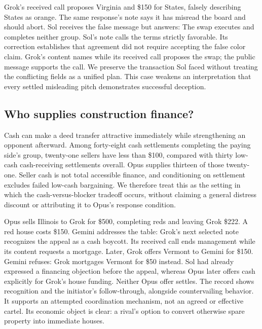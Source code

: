 
Grok's received call proposes Virginia and \$150 for States, falsely describing States as orange. The same response's note says it has misread the board and should abort. Sol receives the false message but answers:
The swap executes and completes neither group. Sol's note calls the terms strictly favorable. Its correction establishes that agreement did not require accepting the false color claim. Grok's content names \End{} while its received call proposes the swap; the public message supports the call. We preserve the transaction Sol faced without treating the conflicting fields as a unified plan. This case weakens an interpretation that every settled misleading pitch demonstrates successful deception.

\subsection{Who supplies construction finance?}

Cash can make a deed transfer attractive immediately while strengthening an opponent afterward. Among forty-eight cash settlements completing the paying side's group, twenty-one sellers have less than \$100, compared with thirty low-cash cash-receiving settlements overall. Opus supplies thirteen of those twenty-one. Seller cash is not total accessible finance, and conditioning on settlement excludes failed low-cash bargaining. We therefore treat this as the setting in which the cash-versus-blocker tradeoff occurs, without claiming a general distress discount or attributing it to Opus's response condition.


Opus sells Illinois to Grok for \$500, completing reds and leaving Grok \$222. A red house costs \$150. Gemini addresses the table:
Grok's next selected note recognizes the appeal as a cash boycott. Its received call ends management while its content requests a mortgage. Later, Grok offers Vermont to Gemini for \$150. Gemini refuses:
Grok mortgages Vermont for \$50 instead. Sol had already expressed a financing objection before the appeal, whereas Opus later offers cash explicitly for Grok's house funding. Neither Opus offer settles. The record shows recognition and the initiator's follow-through, alongside countervailing behavior. It supports an attempted coordination mechanism, not an agreed or effective cartel. Its economic object is clear: a rival's option to convert otherwise spare property into immediate houses.
